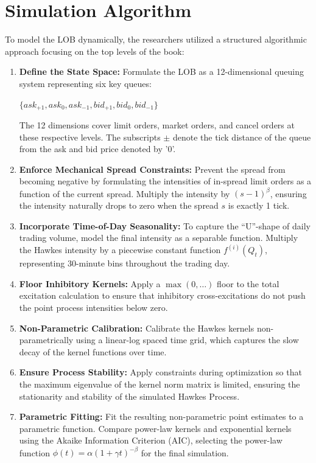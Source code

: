 \section{Simulation Algorithm}

To model the LOB dynamically, the researchers utilized a structured algorithmic approach focusing on the top levels of the book:

\begin{enumerate}
    \item \textbf{Define the State Space:} Formulate the LOB as a 12-dimensional queuing system representing six key queues:
    \begin{center}
        $\{ask_{+1}, ask_0, ask_{-1}, bid_{+1}, bid_0, bid_{-1}\}$
    \end{center}
    The 12 dimensions cover limit orders, market orders, and cancel orders at these respective levels. The subscripts $\pm$ denote the tick distance of the queue from the ask and bid price denoted by '0'.
    \item \textbf{Enforce Mechanical Spread Constraints:} Prevent the spread from becoming negative by formulating the intensities of in-spread limit orders as a function of the current spread. Multiply the intensity by $(s-1)^{\beta}$, ensuring the intensity naturally drops to zero when the spread $s$ is exactly 1 tick.
    \item \textbf{Incorporate Time-of-Day Seasonality:} To capture the ``U''-shape of daily trading volume, model the final intensity as a separable function. Multiply the Hawkes intensity by a piecewise constant function $f^{(i)}(Q_t)$, representing 30-minute bins throughout the trading day.
    \item \textbf{Floor Inhibitory Kernels:} Apply a $\max(0, \dots)$ floor to the total excitation calculation to ensure that inhibitory cross-excitations do not push the point process intensities below zero.
    \item \textbf{Non-Parametric Calibration:} Calibrate the Hawkes kernels non-parametrically using a linear-log spaced time grid, which captures the slow decay of the kernel functions over time.
    \item \textbf{Ensure Process Stability:} Apply constraints during optimization so that the maximum eigenvalue of the kernel norm matrix is limited, ensuring the stationarity and stability of the simulated Hawkes Process.
    \item \textbf{Parametric Fitting:} Fit the resulting non-parametric point estimates to a parametric function. Compare power-law kernels and exponential kernels using the Akaike Information Criterion (AIC), selecting the power-law function $\phi(t) = \alpha(1+\gamma t)^{-\beta}$ for the final simulation.

\end{enumerate}
